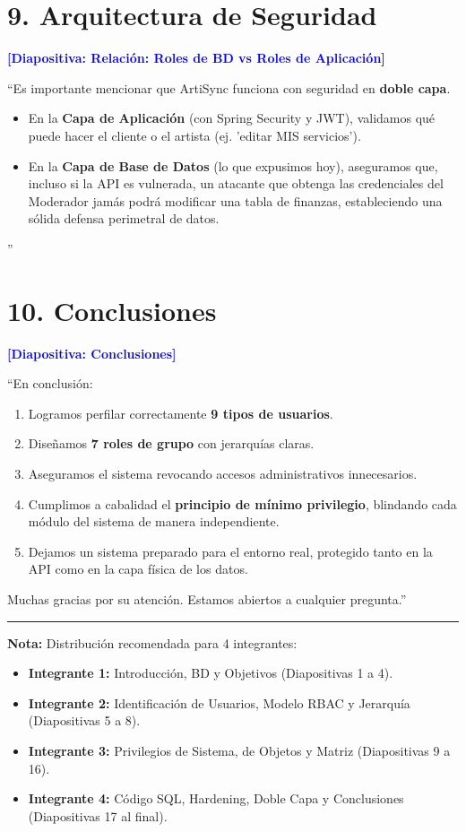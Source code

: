 \documentclass[12pt, a4paper]{article}
\begin{document}
\section*{9. Arquitectura de Seguridad}
\textbf{\textcolor{blue}{[Diapositiva: Relación: Roles de BD vs Roles de Aplicación]}}

``Es importante mencionar que ArtiSync funciona con seguridad en \textbf{doble capa}.
\begin{itemize}
    \item En la \textbf{Capa de Aplicación} (con Spring Security y JWT), validamos qué puede hacer el cliente o el artista (ej. 'editar MIS servicios').
    \item En la \textbf{Capa de Base de Datos} (lo que expusimos hoy), aseguramos que, incluso si la API es vulnerada, un atacante que obtenga las credenciales del Moderador jamás podrá modificar una tabla de finanzas, estableciendo una sólida defensa perimetral de datos.
\end{itemize}''

\section*{10. Conclusiones}
\textbf{\textcolor{blue}{[Diapositiva: Conclusiones]}}

``En conclusión:
\begin{enumerate}
    \item Logramos perfilar correctamente \textbf{9 tipos de usuarios}.
    \item Diseñamos \textbf{7 roles de grupo} con jerarquías claras.
    \item Aseguramos el sistema revocando accesos administrativos innecesarios.
    \item Cumplimos a cabalidad el \textbf{principio de mínimo privilegio}, blindando cada módulo del sistema de manera independiente.
    \item Dejamos un sistema preparado para el entorno real, protegido tanto en la API como en la capa física de los datos.
\end{enumerate}
Muchas gracias por su atención. Estamos abiertos a cualquier pregunta.''

\vspace{1cm}
\hrule
\vspace{0.5cm}
\noindent\textbf{Nota:} Distribución recomendada para 4 integrantes:
\begin{itemize}
    \item \textbf{Integrante 1:} Introducción, BD y Objetivos (Diapositivas 1 a 4).
    \item \textbf{Integrante 2:} Identificación de Usuarios, Modelo RBAC y Jerarquía (Diapositivas 5 a 8).
    \item \textbf{Integrante 3:} Privilegios de Sistema, de Objetos y Matriz (Diapositivas 9 a 16).
    \item \textbf{Integrante 4:} Código SQL, Hardening, Doble Capa y Conclusiones (Diapositivas 17 al final).
\end{itemize}
\end{document}

